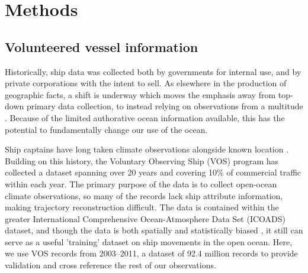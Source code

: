\section{\textbf{Methods}}



\subsection{Volunteered vessel information}


Historically, ship data was collected both by governments for internal use, and by private corporations with the intent to sell. As elsewhere in the production of geographic facts, a shift is underway which moves the emphasis away from top-down primary data collection, to instead relying on observations from a multitude \citep{goodchild1999cartographic,goodchild2007citizens,elwood2011researching}. Because of the limited authorative ocean information available, this has the potential to fundamentally change our use of the ocean.

Ship captains have long taken climate observations alongside known location \cite{brohan2009marine}.  Building on this history, the Voluntary Observing Ship (VOS) \citep{VOSOverview} program has collected a dataset spanning over 20 years and covering 10\% of commercial traffic within each year. The primary purpose of the data is to collect open-ocean climate observations, so many of the records lack ship attribute information, making trajectory reconstruction difficult. The data is contained within the greater International Comprehensive Ocean-Atmosphere Data Set (ICOADS) dataset, and though the data is both spatially and statistically biased \citep{Wang2007}, it still can serve as a useful 'training' dataset on ship movements in the open ocean. Here, we use VOS records from 2003--2011, a dataset of 92.4 
million records to provide validation and cross reference the rest of our observations. %

